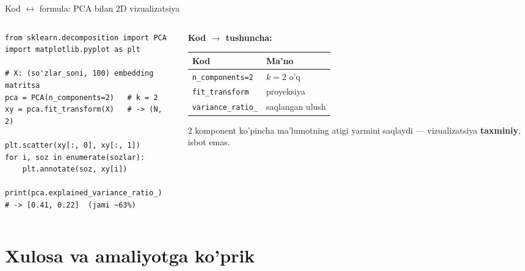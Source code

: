 \documentclass[aspectratio=169,11pt]{beamer}
\begin{document}
\begin{frame}[fragile]{Kod $\leftrightarrow$ formula: PCA bilan 2D vizualizatsiya}
  \begin{columns}[T]
    \begin{column}{0.56\textwidth}
\begin{lstlisting}
from sklearn.decomposition import PCA
import matplotlib.pyplot as plt

# X: (so'zlar_soni, 100) embedding matritsa
pca = PCA(n_components=2)   # k = 2
xy = pca.fit_transform(X)   # -> (N, 2)

plt.scatter(xy[:, 0], xy[:, 1])
for i, soz in enumerate(sozlar):
    plt.annotate(soz, xy[i])

print(pca.explained_variance_ratio_)
# -> [0.41, 0.22]  (jami ~63%)
\end{lstlisting}
    \end{column}
    \begin{column}{0.40\textwidth}
      \textbf{Kod $\to$ tushuncha:}\\[3pt]
      \footnotesize
      \begin{tabular}{p{2.0cm}p{2.0cm}}
        \toprule
        Kod & Ma'no \\
        \midrule
        \texttt{n\_components=2} & $k=2$ o'q \\
        \texttt{fit\_transform} & proyeksiya \\
        \texttt{variance\_ratio\_} & saqlangan ulush \\
        \bottomrule
      \end{tabular}
      \vspace{4pt}
      \begin{tcolorbox}[warnbox,title=Eslatma,top=2pt,bottom=2pt]
        \footnotesize
        2 komponent ko'pincha ma'lumotning
        atigi yarmini saqlaydi --- vizualizatsiya
        \textbf{taxminiy}, isbot emas.
      \end{tcolorbox}
    \end{column}
  \end{columns}
\end{frame}

\section[Xulosa]{Xulosa va amaliyotga ko'prik}
\end{document}
